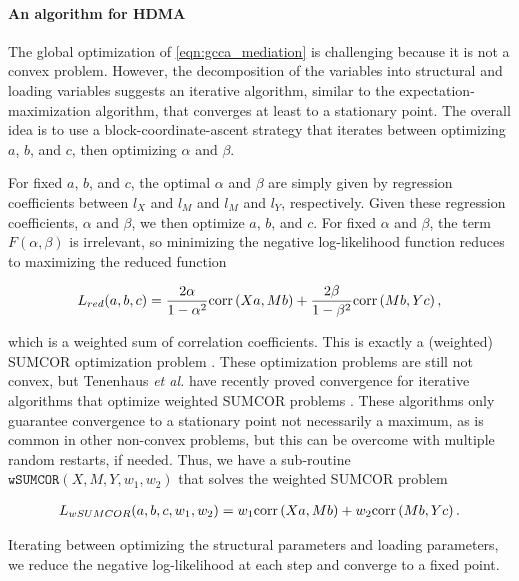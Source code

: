 \documentclass[
]{article}
\begin{document}
\paragraph{An algorithm for HDMA}\label{an-algorithm-for-hdma}

The global optimization of \ref{eqn:gcca_mediation} is challenging
because it is not a convex problem. However, the decomposition of the
variables into structural and loading variables suggests an iterative
algorithm, similar to the expectation-maximization algorithm, that
converges at least to a stationary point. The overall idea is to use a
block-coordinate-ascent strategy that iterates between optimizing \(a\),
\(b\), and \(c\), then optimizing \(\alpha\) and \(\beta\).

For fixed \(a\), \(b\), and \(c\), the optimal \(\alpha\) and \(\beta\)
are simply given by regression coefficients between \(l_X\) and \(l_M\)
and \(l_M\) and \(l_Y\), respectively. Given these regression
coefficients, \(\alpha\) and \(\beta\), we then optimize \(a\), \(b\),
and \(c\). For fixed \(\alpha\) and \(\beta\), the term
\(F(\alpha, \beta)\) is irrelevant, so minimizing the negative
log-likelihood function reduces to maximizing the reduced function

\begin{align}
L_{red}(a,b,c) = \frac{2\alpha}{1-\alpha^2} {\rm corr}\left(Xa, Mb\right) + \frac{2\beta}{1-\beta^2} {\rm corr}\left(Mb, Yc\right),
\end{align}

which is a weighted sum of correlation coefficients. This is exactly a
(weighted) SUMCOR optimization problem \cite{tenenhaus2011regularized}.
These optimization problems are still not convex, but Tenenhaus
\textit{et al.} have recently proved convergence for iterative
algorithms that optimize weighted SUMCOR problems
\cite{tenenhaus2011regularized,
tenenhaus2017regularized, tenenhaus2015kernel}. These algorithms only
guarantee convergence to a stationary point not necessarily a maximum,
as is common in other non-convex problems, but this can be overcome with
multiple random restarts, if needed. Thus, we have a sub-routine
\(\texttt{wSUMCOR}(X, M, Y, w_1, w_2)\) that solves the weighted SUMCOR
problem

\begin{align}
L_{wSUMCOR}(a,b,c, w_1, w_2) = w_1 {\rm corr}\left(Xa, Mb\right) + w_2 {\rm corr}\left(Mb, Yc\right).
\end{align}

Iterating between optimizing the structural parameters and loading
parameters, we reduce the negative log-likelihood at each step and
converge to a fixed point.
\end{document}
